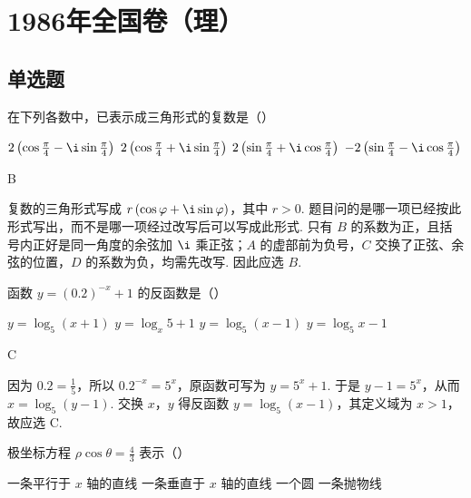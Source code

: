 \chapter{1986年全国卷（理）}

\section{单选题}

\begin{problem}

在下列各数中，已表示成三角形式的复数是（\quad）

\choices
    {\(2\left(\cos \frac{\pi}{4} - \i\sin \frac{\pi}{4}\right)\)}
    {\(2\left(\cos \frac{\pi}{4} + \i\sin \frac{\pi}{4}\right)\)}
    {\(2\left(\sin \frac{\pi}{4} + \i\cos \frac{\pi}{4}\right)\)}
    {\(-2\left(\sin \frac{\pi}{4} - \i\cos \frac{\pi}{4}\right)\)}
\end{problem}

\begin{answer}
B
\end{answer}

\begin{solution}
复数的三角形式写成 \(r\left(\cos\varphi+\i\sin\varphi\right)\)，其中 \(r>0\). 题目问的是哪一项已经按此形式写出，而不是哪一项经过改写后可以写成此形式. 只有 \(B\) 的系数为正，且括号内正好是同一角度的余弦加 \(\i\) 乘正弦；\(A\) 的虚部前为负号，\(C\) 交换了正弦、余弦的位置，\(D\) 的系数为负，均需先改写. 因此应选 \(B\).
\end{solution}

\begin{problem}

函数 \(y = (0.2)^{-x} + 1\) 的反函数是（\quad）

\choices
    {\(y = \log_5 (x + 1)\)}
    {\(y = \log_x 5 + 1\)}
    {\(y = \log_5 (x - 1)\)}
    {\(y = \log_5 x - 1\)}
\end{problem}

\begin{answer}
C
\end{answer}

\begin{solution}
因为 \(0.2=\frac{1}{5}\)，所以 \(0.2^{-x}=5^x\)，原函数可写为 \(y=5^x+1\). 于是 \(y-1=5^x\)，从而 \(x=\log_5(y-1)\). 交换 \(x\)，\(y\) 得反函数 \(y=\log_5(x-1)\)，其定义域为 \(x>1\)，故应选 C.
\end{solution}

\begin{problem}

极坐标方程 \(\rho \cos \theta = \frac{4}{3}\) 表示（\quad）

\choices
    {一条平行于 \(x\) 轴的直线}
    {一条垂直于 \(x\) 轴的直线}
    {一个圆}
    {一条抛物线}
\end{problem}

